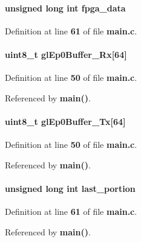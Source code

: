 \paragraph[{fpga\+\_\+data}]{\setlength{\rightskip}{0pt plus 5cm}unsigned long int fpga\+\_\+data}\label{main_8c_a04368317ea9ed61b83a391a0f93ae08a}


Definition at line {\bf 61} of file {\bf main.\+c}.

\paragraph[{gl\+Ep0\+Buffer\+\_\+\+Rx}]{\setlength{\rightskip}{0pt plus 5cm}uint8\+\_\+t gl\+Ep0\+Buffer\+\_\+\+Rx[64]}\label{main_8c_a4e808330155f53528aa1b36f7f41a38f}


Definition at line {\bf 50} of file {\bf main.\+c}.



Referenced by {\bf main()}.

\paragraph[{gl\+Ep0\+Buffer\+\_\+\+Tx}]{\setlength{\rightskip}{0pt plus 5cm}uint8\+\_\+t gl\+Ep0\+Buffer\+\_\+\+Tx[64]}\label{main_8c_a5438d8ff3d517cb618c6e233634b293a}


Definition at line {\bf 50} of file {\bf main.\+c}.



Referenced by {\bf main()}.

\paragraph[{last\+\_\+portion}]{\setlength{\rightskip}{0pt plus 5cm}unsigned long int last\+\_\+portion}\label{main_8c_a39310ff22a3a6c8084300b507a873da6}


Definition at line {\bf 61} of file {\bf main.\+c}.



Referenced by {\bf main()}.

